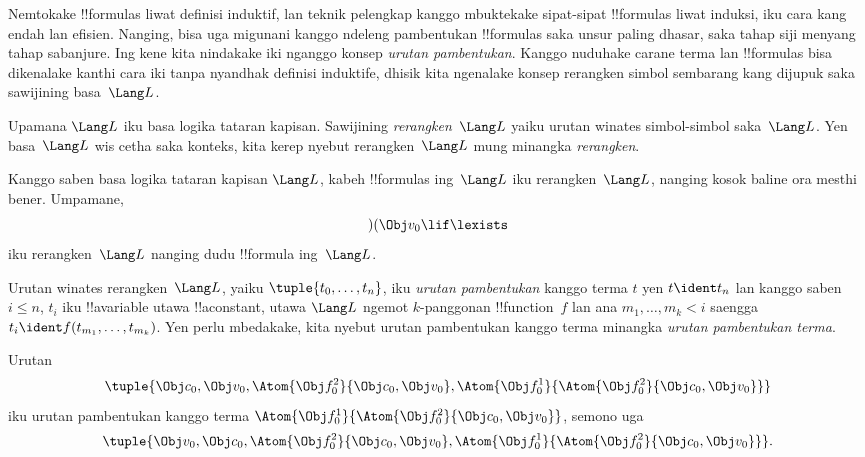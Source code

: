 \documentclass[../../../include/open-logic-section]{subfiles}
\begin{document}


Nemtokake !!{formula}s liwat definisi induktif, lan teknik pelengkap
kanggo mbuktekake sipat-sipat !!{formula}s liwat induksi, iku cara kang
endah lan efisien. Nanging, bisa uga migunani kanggo ndeleng
pambentukan !!{formula}s saka unsur paling dhasar, saka tahap siji menyang tahap sabanjure.
Ing kene kita nindakake iki nganggo konsep \emph{urutan pambentukan}.
%
Kanggo nuduhake carane terma lan !!{formula}s bisa dikenalake kanthi
cara iki tanpa nyandhak definisi induktife, dhisik kita ngenalake
konsep rerangken simbol sembarang kang dijupuk saka sawijining
basa~$\Lang L$.

\begin{defn}
Upamana $\Lang L$ iku basa logika tataran kapisan. Sawijining
\emph{rerangken~$\Lang L$} yaiku urutan winates simbol-simbol
saka~$\Lang L$. Yen basa~$\Lang L$ wis cetha saka konteks, kita
kerep nyebut rerangken~$\Lang L$ mung minangka \emph{rerangken}.
\end{defn}

\begin{ex}
Kanggo saben basa logika tataran kapisan $\Lang L$, kabeh
!!{formula}s ing~$\Lang L$ iku rerangken~$\Lang L$, nanging kosok baline
ora mesthi bener. Umpamane, \[)(\Obj v_0\lif\lexists\] iku
rerangken~$\Lang L$ nanging dudu !!{formula} ing~$\Lang L$.
\end{ex}

\begin{defn}
Urutan winates rerangken~$\Lang L$, yaiku $\tuple{t_0,\dotsc,t_n}$,
iku \emph{urutan pambentukan} kanggo terma $t$ yen $t \ident t_n$
lan kanggo saben $i \leq n$, $t_i$ iku !!a{variable} utawa
!!a{constant}, utawa $\Lang L$ ngemot $k$-panggonan !!{function}~$f$
lan ana $m_1,\dotsc,m_k < i$ saengga
$t_i \ident f(t_{m_1},\dotsc,t_{m_k})$. Yen perlu mbedakake,
kita nyebut urutan pambentukan kanggo terma minangka
\emph{urutan pambentukan terma}.
\end{defn}

\begin{ex}
Urutan
\[
    \tuple{\Obj c_0, \Obj v_0, \Atom{\Obj f^2_0}{\Obj c_0, \Obj v_0}, \Atom{\Obj f^1_0}{\Atom{\Obj f^2_0}{\Obj c_0, \Obj v_0}}}
\]
iku urutan pambentukan kanggo terma $\Atom{\Obj f^1_0}{\Atom{\Obj
f^2_0}{\Obj c_0, \Obj v_0}}$, semono uga
\[
    \tuple{\Obj v_0, \Obj c_0, \Atom{\Obj f^2_0}{\Obj c_0, \Obj v_0}, \Atom{\Obj f^1_0}{\Atom{\Obj f^2_0}{\Obj c_0, \Obj v_0}}}.
\]
\end{ex}
\end{document}
